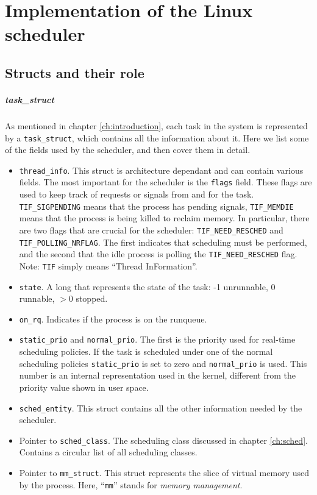 \chapter{Implementation of the Linux scheduler}
\label{chap:implementation}

\section{Structs and their role}

\paragraph{task\_struct}
As mentioned in chapter \ref{ch:introduction}, each task in the system is represented \newline by a \verb|task_struct|, which contains all the information about it. Here we list some of the fields used by the scheduler, and then cover them in detail.
\begin{itemize}
    \item \verb|thread_info|. This struct is architecture dependant and can contain various fields. The most important for the scheduler is the \verb|flags| field. These flags are used to keep track of requests or signals from and for the task. \verb|TIF_SIGPENDING| means that the process has pending signals, \verb|TIF_MEMDIE| means that the process is being killed to reclaim memory. In particular, there are two flags that are crucial for the scheduler: \verb|TIF_NEED_RESCHED| and \verb|TIF_POLLING_NRFLAG|. The first indicates that scheduling must be performed, and the second that the idle process is polling the \verb|TIF_NEED_RESCHED| flag. Note: \verb|TIF| simply means ``Thread InFormation''.
    \item \verb|state|. A long that represents the state of the task: -1 unrunnable, 0 runnable, $>0$ stopped. 
    \item \verb|on_rq|. Indicates if the process is on the runqueue.
    \item \verb|static_prio| and \verb|normal_prio|. The first is the priority used for real-time scheduling policies. If the task is scheduled under one of the normal scheduling policies \verb|static_prio| is set to zero and \verb|normal_prio| is used. This number is an internal representation used in the kernel, different from the priority value shown in user space.
    \item \verb|sched_entity|. This struct contains all the other information needed by the scheduler.
    \item Pointer to \verb|sched_class|. The scheduling class discussed in chapter \ref{ch:sched}. Contains a circular list of all scheduling classes.
    \item Pointer to \verb|mm_struct|. This struct represents the slice of virtual memory used by the process. Here, ``\verb|mm|'' stands for \textit{memory management}.
\end{itemize}

